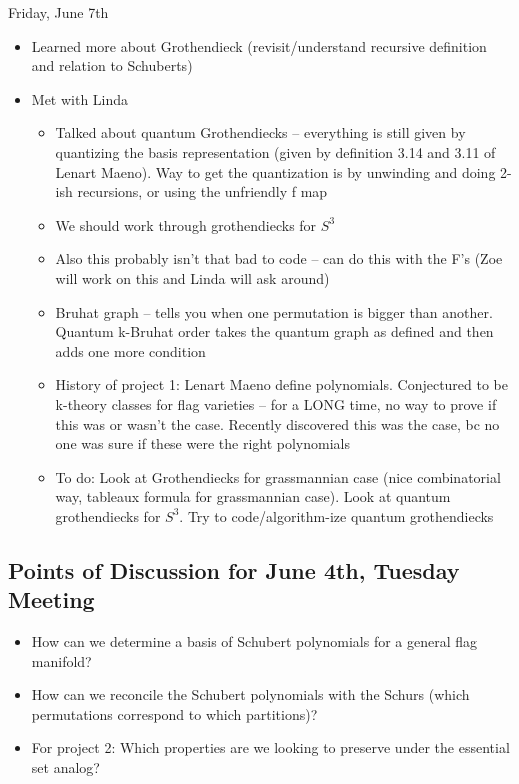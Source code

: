 Friday, June 7th
\begin{itemize}
    \item Learned more about Grothendieck (revisit/understand recursive definition and relation to Schuberts)
    \item Met with Linda
    \begin{itemize}
        \item Talked about quantum Grothendiecks -- everything is still given by quantizing the basis representation (given by definition 3.14 and 3.11 of Lenart Maeno). Way to get the quantization is by unwinding and doing 2-ish recursions, or using the unfriendly f map
        \item We should work through grothendiecks for $S^3$
        \item Also this probably isn't that bad to code -- can do this with the F's (Zoe will work on this and Linda will ask around)
        \item Bruhat graph -- tells you when one permutation is bigger than another. Quantum k-Bruhat order takes the quantum graph as defined and then adds one more condition
        \item History of project 1: Lenart Maeno define polynomials. Conjectured to be k-theory classes for flag varieties -- for a LONG time, no way to prove if this was or wasn't the case. Recently discovered this was the case, bc no one was sure if these were the right polynomials
        \item To do: Look at Grothendiecks for grassmannian case (nice combinatorial way, tableaux formula for grassmannian case). Look at quantum grothendiecks for $S^3$. Try to code/algorithm-ize quantum grothendiecks
    \end{itemize}
\end{itemize}

\subsection{Points of Discussion for June 4th, Tuesday Meeting}

\begin{itemize}
    \item How can we determine a basis of Schubert polynomials for a general flag manifold?
    \item How can we reconcile the Schubert polynomials with the Schurs (which permutations correspond to which partitions)?
    \item For project 2: Which properties are we looking to preserve under the essential set analog?
\end{itemize}

